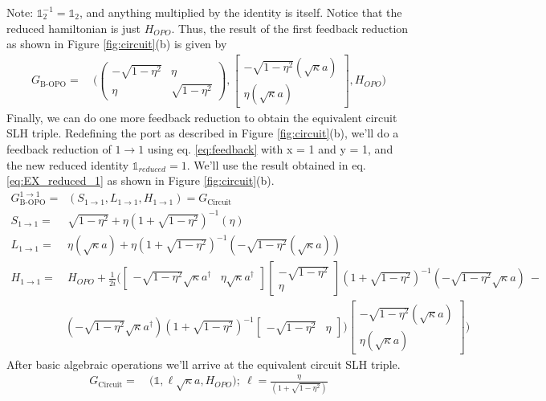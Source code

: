 \documentclass[a4paper]{article}
\theoremstyle{definition}
\begin{document}
Note:  $\mathbb{1}^{-1}_2 = \mathbb{1}_2$, and anything multiplied by the identity is itself. Notice that the reduced hamiltonian is just $H_{OPO}$. Thus, the result of the first feedback reduction as shown in Figure \ref{fig:circuit}(b) is given by 
\begin{align}
    G_{\text{B-OPO}} = & \ \Bigg( \begin{pmatrix} -\sqrt{1-\eta^2} & \eta \\ \eta & \sqrt{1-\eta^2} \end{pmatrix}, \begin{bmatrix}  -\sqrt{1-\eta^2}(\sqrt{\kappa}a) \\ \eta(\sqrt{\kappa}a) \end{bmatrix}, H_{OPO}  \Bigg)
    \label{eq:EX_reduced_1}
\end{align}
Finally, we can do one more feedback reduction to obtain the equivalent circuit SLH triple. Redefining the port as described in Figure \ref{fig:circuit}(b), we'll do a feedback reduction of $1 \rightarrow 1$ using eq. \ref{eq:feedback} with x = 1 and y = 1, and the new reduced identity $\mathbb{1}_{reduced} = 1$. We'll use the result obtained in eq. \ref{eq:EX_reduced_1} as shown in Figure \ref{fig:circuit}(b).
\begin{align*}
    G_{\text{B-OPO}}^{1 \rightarrow 1} = & \ (S_{1 \rightarrow 1}, L_{1 \rightarrow 1}, H_{1 \rightarrow 1}) =  G_{\text{Circuit}} & \\
    S_{1 \rightarrow 1} = & \ \sqrt{1-\eta^2} + \eta (1+\sqrt{1-\eta^2})^{-1}(\eta)& \\
    L_{1 \rightarrow 1} = & \ \eta(\sqrt{\kappa}a) + \eta (1+\sqrt{1-\eta^2})^{-1}(-\sqrt{1-\eta^2}(\sqrt{\kappa}a)) & \\
    H_{1 \rightarrow 1} = & \ H_{OPO} + \frac{1}{2i}\Bigg( \begin{bmatrix} -\sqrt{1-\eta^2}\sqrt{\kappa}a^\dagger  & \eta \sqrt{\kappa}a^\dagger \end{bmatrix} \begin{bmatrix}   -\sqrt{1-\eta^2} \\ \eta \end{bmatrix}  (1+\sqrt{1-\eta^2})^{-1} ( -\sqrt{1-\eta^2}\sqrt{\kappa}a) \ - &  
    \\ &  ( -\sqrt{1-\eta^2}\sqrt{\kappa}a^\dagger) (1+\sqrt{1-\eta^2})^{-1} \begin{bmatrix}  - \sqrt{1-\eta^2} & \eta \end{bmatrix} ) \begin{bmatrix} -\sqrt{1-\eta^2}(\sqrt{\kappa}a) \\ \eta(\sqrt{\kappa}a) \end{bmatrix} \Bigg)& 
\end{align*}
After basic algebraic operations we'll arrive at the equivalent circuit SLH triple. 
\begin{align}
    G_{\text{Circuit}} = & \ \Bigg( \mathbb{1}, \ell \sqrt{\kappa}a ,H_{OPO}\Bigg); \ \ell = \frac{\eta}{(1+\sqrt{1-\eta^2})}
    \label{eq:Ex_Circuit}
\end{align}
\end{document}
